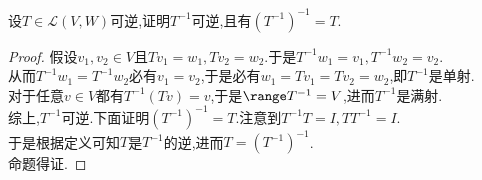 \documentclass{ctexart}
\begin{document}
\pagestyle{empty}
\begin{problem}[1.]
    设$T\in\mathcal{L}(V,W)$可逆,证明$T^{-1}$可逆,且有$\left(T^{-1}\right)^{-1}=T$.
\end{problem}
\begin{proof}
    假设$v_1,v_2\in V$且$Tv_1=w_1,Tv_2=w_2$.于是$T^{-1}w_1=v_1,T^{-1}w_2=v_2$.\\
    从而$T^{-1}w_1=T^{-1}w_2$必有$v_1=v_2$,于是必有$w_1=Tv_1=Tv_2=w_2$,即$T^{-1}$是单射.\\
    对于任意$v\in V$都有$T^{-1}(Tv)=v$,于是$\range T^{-1}=V$,进而$T^{-1}$是满射.\\
    综上,$T^{-1}$可逆.下面证明$\left(T^{-1}\right)^{-1}=T$.注意到$T^{-1}T=I,TT^{-1}=I$.\\
    于是根据定义可知$T$是$T^{-1}$的逆,进而$T=\left(T^{-1}\right)^{-1}$.\\
    命题得证.
\end{proof}
\end{document}
